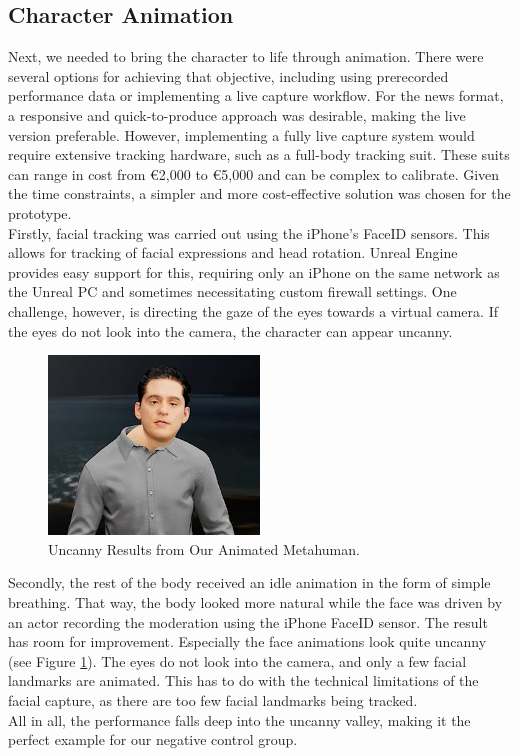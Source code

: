 \documentclass[
  a4paper,  %
  twoside,  %
  bibliography=totoc,
  headsepline,
  cleardoublepage=empty,
  parskip=half,
  draft=false
]{scrbook}
\begin{document}
\subsection*{Character Animation}
Next, we needed to bring the character to life through animation. There were several options for achieving that objective, including using prerecorded performance data or implementing a live capture workflow. For the news format, a responsive and quick-to-produce approach was desirable, making the live version preferable. However, implementing a fully live capture system would require extensive tracking hardware, such as a full-body tracking suit. These suits can range in cost from €2,000 to €5,000 and can be complex to calibrate. Given the time constraints, a simpler and more cost-effective solution was chosen for the prototype. \\
Firstly, facial tracking was carried out using the iPhone's FaceID sensors. This allows for tracking of facial expressions and head rotation. Unreal Engine provides easy support for this, requiring only an iPhone on the same network as the Unreal PC and sometimes necessitating custom firewall settings. One challenge, however, is directing the gaze of the eyes towards a virtual camera. If the eyes do not look into the camera, the character can appear uncanny. 

\begin{figure}[h]
  \centering
  \includegraphics[width=0.5\textwidth]{graphics/unreal-engine/MH/bent-head.png}
  \caption{Uncanny Results from Our Animated Metahuman.}
  \label{fig:uncanny mh}
\end{figure}

Secondly, the rest of the body received an idle animation in the form of simple breathing. That way, the body looked more natural while the face was driven by an actor recording the moderation using the iPhone FaceID sensor. The result has room for improvement. Especially the face animations look quite uncanny (see Figure \ref{fig:uncanny mh}). The eyes do not look into the camera, and only a few facial landmarks are animated. This has to do with the technical limitations of the facial capture, as there are too few facial landmarks being tracked. \\
All in all, the performance falls deep into the uncanny valley, making it the perfect example for our negative control group.
\end{document}
